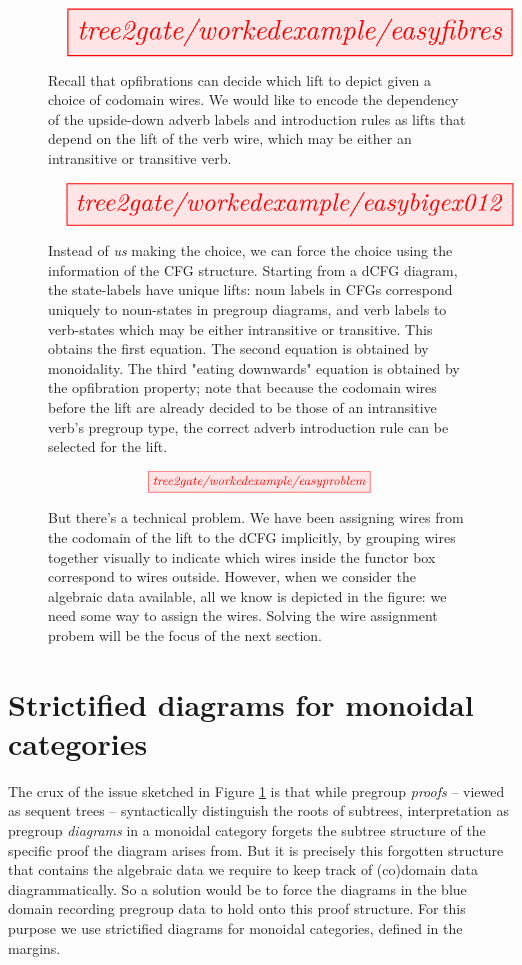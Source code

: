 \begin{figure}[h!]
\[\resizebox{\textwidth}{!}{\tikzfig{tree2gate/workedexample/easyfibres}}\]
\caption{
Recall that opfibrations can decide which lift to depict given a choice of codomain wires. We would like to encode the dependency of the upside-down adverb labels and introduction rules as lifts that depend on the lift of the verb wire, which may be either an intransitive or transitive verb.
}
\end{figure}

\begin{figure}[h!]
\[\resizebox{\textwidth}{!}{\tikzfig{tree2gate/workedexample/easybigex012}}\]
\caption{
Instead of \emph{us} making the choice, we can force the choice using the information of the CFG structure. Starting from a dCFG diagram, the state-labels have unique lifts: noun labels in CFGs correspond uniquely to noun-states in pregroup diagrams, and verb labels to verb-states which may be either intransitive or transitive. This obtains the first equation. The second equation is obtained by monoidality. The third "eating downwards" equation is obtained by the opfibration property; note that because the codomain wires before the lift are already decided to be those of an intransitive verb's pregroup type, the correct adverb introduction rule can be selected for the lift.
}
\end{figure}

\begin{figure}[h!]\label{fig:wireproblem}
\[\resizebox{0.5\textwidth}{!}{\tikzfig{tree2gate/workedexample/easyproblem}}\]
\caption{
But there's a technical problem. We have been assigning wires from the codomain of the lift to the dCFG implicitly, by grouping wires together visually to indicate which wires inside the functor box correspond to wires outside. However, when we consider the algebraic data available, all we know is depicted in the figure: we need some way to assign the wires. Solving the wire assignment probem will be the focus of the next section.
}
\end{figure}
\clearpage
\section{Strictified diagrams for monoidal categories}

The crux of the issue sketched in Figure \ref{fig:wireproblem} is that while pregroup \emph{proofs} -- viewed as sequent trees -- syntactically distinguish the roots of subtrees, interpretation as pregroup \emph{diagrams} in a monoidal category forgets the subtree structure of the specific proof the diagram arises from. But it is precisely this forgotten structure that contains the algebraic data we require to keep track of (co)domain data diagrammatically. So a solution would be to force the diagrams in the blue domain recording pregroup data to hold onto this proof structure. For this purpose we use strictified diagrams for monoidal categories, defined in the margins.\\

